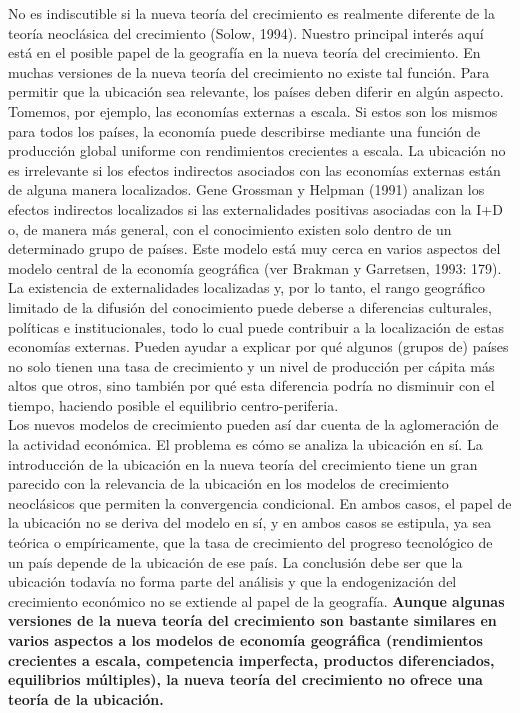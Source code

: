 No es indiscutible si la nueva teoría del crecimiento es realmente diferente de la teoría neoclásica del crecimiento (Solow, 1994). Nuestro principal interés aquí está en el posible papel de la geografía en la nueva teoría del crecimiento. En muchas versiones de la nueva teoría del crecimiento no existe tal función. Para permitir que la ubicación sea relevante, los países deben diferir en algún aspecto. Tomemos, por ejemplo, las economías externas a escala. Si estos son los mismos para todos los países, la economía puede describirse mediante una función de producción global uniforme con rendimientos crecientes a escala. La ubicación no es irrelevante si los efectos indirectos asociados con las economías externas están de alguna manera localizados. Gene Grossman y Helpman (1991) analizan los efectos indirectos localizados si las externalidades positivas asociadas con la I+D o, de manera más general, con el conocimiento existen solo dentro de un determinado grupo de países. Este modelo está muy cerca en varios aspectos del modelo central de la economía geográfica (ver Brakman y Garretsen, 1993: 179). La existencia de externalidades localizadas y, por lo tanto, el rango geográfico limitado de la difusión del conocimiento puede deberse a diferencias culturales, políticas e institucionales, todo lo cual puede contribuir a la localización de estas economías externas. Pueden ayudar a explicar por qué algunos (grupos de) países no solo tienen una tasa de crecimiento y un nivel de producción per cápita más altos que otros, sino también por qué esta diferencia podría no disminuir con el tiempo, haciendo posible el equilibrio centro-periferia.\\
Los nuevos modelos de crecimiento pueden así dar cuenta de la aglomeración de la actividad económica. El problema es cómo se analiza la ubicación en sí. La introducción de la ubicación en la nueva teoría del crecimiento tiene un gran parecido con la relevancia de la ubicación en los modelos de crecimiento neoclásicos que permiten la convergencia condicional. En ambos casos, el papel de la ubicación no se deriva del modelo en sí, y en ambos casos se estipula, ya sea teórica o empíricamente, que la tasa de crecimiento del progreso tecnológico de un país depende de la ubicación de ese país. La conclusión debe ser que la ubicación todavía no forma parte del análisis y que la endogenización del crecimiento económico no se extiende al papel de la geografía. \textbf{Aunque algunas versiones de la nueva teoría del crecimiento son bastante similares en varios aspectos a los modelos de economía geográfica (rendimientos crecientes a escala, competencia imperfecta, productos diferenciados, equilibrios múltiples), la nueva teoría del crecimiento no ofrece una teoría de la ubicación.}

